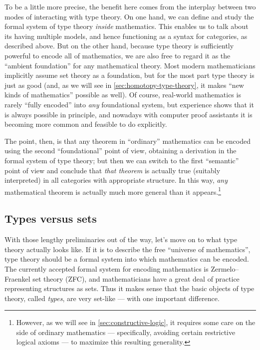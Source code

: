 \documentclass[12pt]{article}
\numberwithin{equation}{section}
\begin{document}
To be a little more precise, the benefit here comes from the interplay between two modes of interacting with type theory.
On one hand, we can define and study the formal system of type theory \emph{inside} mathematics.
This enables us to talk about its having multiple models, and hence functioning as a syntax for categories, as described above.
But on the other hand, because type theory is sufficiently powerful to encode all of mathematics, we are also free to regard it as the ``ambient foundation'' for any mathematical theory.
Most modern mathematicians implicitly assume set theory as a foundation, but for the most part type theory is just as good (and, as we will see in \cref{sec:homotopy-type-theory}, it makes ``new kinds of mathematics'' possible as well).
Of course, real-world mathematics is rarely ``fully encoded'' into \emph{any} foundational system, but experience shows that it is always possible in principle, and nowadays with computer proof assistants it is becoming more common and feasible to do explicitly.

The point, then, is that any theorem in ``ordinary'' mathematics can be encoded using the second ``foundational'' point of view, obtaining a derivation in the formal system of type theory; but then we can switch to the first ``semantic'' point of view and conclude that \emph{that theorem} is actually true (suitably interpreted) in all categories with appropriate structure.
In this way, \emph{any} mathematical theorem is actually much more general than it appears.\footnote{However, as we will see in \cref{sec:constructive-logic}, it requires some care on the side of ordinary mathematics --- specifically, avoiding certain restrictive logical axioms --- to maximize this resulting generality.}


\subsection{Types versus sets}
\label{sec:types-versus-sets}

With those lengthy preliminaries out of the way, let's move on to what type theory actually looks like.
If it is to describe the free ``universe of mathematics'', type theory should be a formal system into which mathematics can be encoded.
The currently accepted formal system for encoding mathematics is Zermelo--Fraenkel set theory (ZFC), and mathematicians have a great deal of practice representing structures as sets.
Thus it makes sense that the basic objects of type theory, called \emph{types}, are very set-like --- with one important difference.
\end{document}
